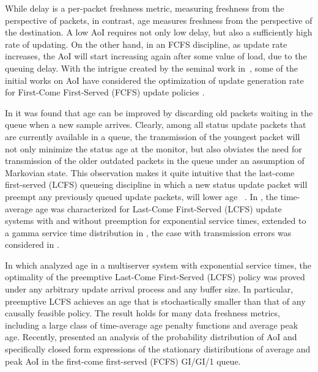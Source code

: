 While delay is a per-packet freshness metric, measuring freshness from the perspective of packets, in contrast, age measures freshness from the perspective of the destination.  A low AoI requires not only low delay, but also a sufficiently high rate of updating. On the other hand, in an FCFS discipline, as update rate increases, the AoI will start increasing again after some value of load, due to the queuing delay.  With the intrigue created by the seminal work in~\cite{KaulYatesGruteser-Infocom2012}, some of the initial works on AoI have considered the optimization of update generation rate for First-Come First-Served (FCFS) update policies \cite{Kaul2012,2012ISIT-YatesKaul,2015ISITHuangModiano}. 

In \cite{Icc2015Pappas, CostaCodreanuEphremides2014ISIT} it was found that age can be improved by discarding
old packets waiting in the queue when a new sample arrives. Clearly, 
among all status update packets that are currently available in a queue, the transmission of the youngest packet
will not only minimize the status age at the monitor, but also obviates the
need for transmission of the older outdated packets in the queue under an assumption of Markovian state. This observation makes it quite intuitive that the last-come first-served (LCFS) queueing discipline in which a new status update packet
will preempt any previously queued update packets, will lower age ~\cite{KaulCISS2012}.  In \cite{KaulCISS2012}, the time-average age was characterized for Last-Come First-Served (LCFS) update systems with and without preemption for exponential service times, extended to a gamma service time distribution in \cite{Gamma_dist}, the case with transmission errors was considered in \cite{age_with_delivery_error}.
 
In \cite{age_optimality_multi_server} which analyzed age in a multiserver system with exponential service times, the optimality of the preemptive Last-Come First-Served (LCFS) policy was proved under any arbitrary update arrival 
process and any buffer size. In particular, preemptive LCFS  achieves an age that is
stochastically smaller than that of any causally feasible policy. The result holds for many data freshness metrics, including
a large class of time-average age penalty functions and average peak age. Recently, \cite{AgeDistributionISIT2017} presented an analysis of the probability distribution of AoI and specifically closed form expressions of the stationary distiributions of average and peak AoI in the first-come first-served (FCFS) GI/GI/1 queue. 

